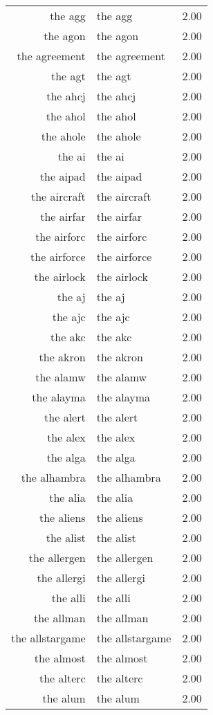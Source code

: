 \begin{table}[ht]
\begin{tabular}{rlr}
  the agg & the agg & 2.00 \\ 
  the agon & the agon & 2.00 \\ 
  the agreement & the agreement & 2.00 \\ 
  the agt & the agt & 2.00 \\ 
  the ahcj & the ahcj & 2.00 \\ 
  the ahol & the ahol & 2.00 \\ 
  the ahole & the ahole & 2.00 \\ 
  the ai & the ai & 2.00 \\ 
  the aipad & the aipad & 2.00 \\ 
  the aircraft & the aircraft & 2.00 \\ 
  the airfar & the airfar & 2.00 \\ 
  the airforc & the airforc & 2.00 \\ 
  the airforce & the airforce & 2.00 \\ 
  the airlock & the airlock & 2.00 \\ 
  the aj & the aj & 2.00 \\ 
  the ajc & the ajc & 2.00 \\ 
  the akc & the akc & 2.00 \\ 
  the akron & the akron & 2.00 \\ 
  the alamw & the alamw & 2.00 \\ 
  the alayma & the alayma & 2.00 \\ 
  the alert & the alert & 2.00 \\ 
  the alex & the alex & 2.00 \\ 
  the alga & the alga & 2.00 \\ 
  the alhambra & the alhambra & 2.00 \\ 
  the alia & the alia & 2.00 \\ 
  the aliens & the aliens & 2.00 \\ 
  the alist & the alist & 2.00 \\ 
  the allergen & the allergen & 2.00 \\ 
  the allergi & the allergi & 2.00 \\ 
  the alli & the alli & 2.00 \\ 
  the allman & the allman & 2.00 \\ 
  the allstargame & the allstargame & 2.00 \\ 
  the almost & the almost & 2.00 \\ 
  the alterc & the alterc & 2.00 \\ 
  the alum & the alum & 2.00 \\ 

\end{tabular}
\end{table}
